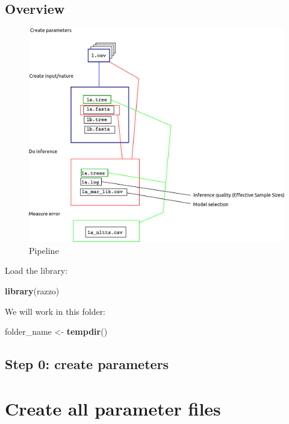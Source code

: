 \documentclass[]{article}
\newenvironment{Shaded}{\begin{snugshade}}{\end{snugshade}}
\newcommand{\KeywordTok}[1]{\textcolor[rgb]{0.13,0.29,0.53}{\textbf{#1}}}
\newcommand{\StringTok}[1]{\textcolor[rgb]{0.31,0.60,0.02}{#1}}
\newcommand{\NormalTok}[1]{#1}
\begin{document}
\subsection{Overview}\label{overview}

\begin{figure}
\centering
\includegraphics{pipeline.png}
\caption{Pipeline}
\end{figure}

Load the library:

\begin{Shaded}
\begin{Highlighting}[]
\KeywordTok{library}\NormalTok{(razzo)}
\end{Highlighting}
\end{Shaded}

We will work in this folder:

\begin{Shaded}
\begin{Highlighting}[]
\NormalTok{folder_name <-}\StringTok{ }\KeywordTok{tempdir}\NormalTok{()}
\end{Highlighting}
\end{Shaded}

\subsection{Step 0: create parameters}\label{step-0-create-parameters}

\section{Create all parameter files}\label{create-all-parameter-files}
\end{document}

